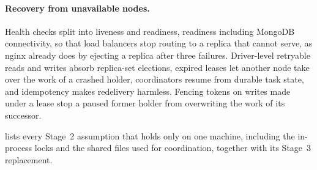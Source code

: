 \documentclass[10pt,a4paper]{article}
\begin{document}
\paragraph{Recovery from unavailable nodes.}
Health checks split into liveness and readiness, readiness including MongoDB
connectivity, so that load balancers stop routing to a replica that cannot
serve, as nginx already does by ejecting a replica after three failures.
Driver-level retryable reads and writes absorb replica-set elections, expired
leases let another node take over the work of a crashed holder, coordinators
resume from durable task state, and idempotency makes redelivery harmless.
Fencing tokens on writes made under a lease stop a paused former holder from
overwriting the work of its successor.

 lists every Stage~2 assumption that holds only on
one machine, including the in-process locks and the shared files used for
coordination, together with its Stage~3 replacement.
\end{document}

